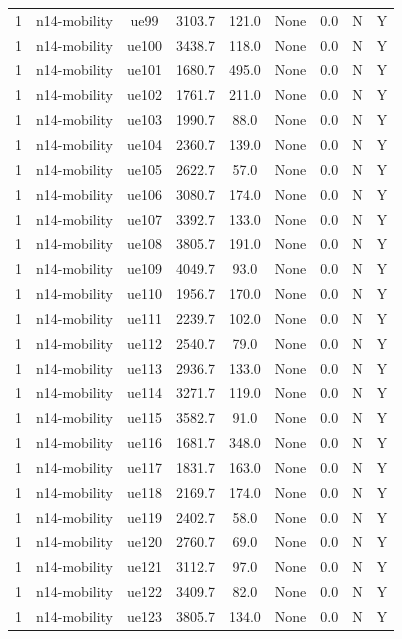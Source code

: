 \begin{table}[ht]
\begin{tabular}{|c|c|c|c|c|c|c|c|c|}
1 & n14-mobility & ue99 & 3103.7 & 121.0 & None & 0.0 & N & Y \\
1 & n14-mobility & ue100 & 3438.7 & 118.0 & None & 0.0 & N & Y \\
1 & n14-mobility & ue101 & 1680.7 & 495.0 & None & 0.0 & N & Y \\
1 & n14-mobility & ue102 & 1761.7 & 211.0 & None & 0.0 & N & Y \\
1 & n14-mobility & ue103 & 1990.7 & 88.0 & None & 0.0 & N & Y \\
1 & n14-mobility & ue104 & 2360.7 & 139.0 & None & 0.0 & N & Y \\
1 & n14-mobility & ue105 & 2622.7 & 57.0 & None & 0.0 & N & Y \\
1 & n14-mobility & ue106 & 3080.7 & 174.0 & None & 0.0 & N & Y \\
1 & n14-mobility & ue107 & 3392.7 & 133.0 & None & 0.0 & N & Y \\
1 & n14-mobility & ue108 & 3805.7 & 191.0 & None & 0.0 & N & Y \\
1 & n14-mobility & ue109 & 4049.7 & 93.0 & None & 0.0 & N & Y \\
1 & n14-mobility & ue110 & 1956.7 & 170.0 & None & 0.0 & N & Y \\
1 & n14-mobility & ue111 & 2239.7 & 102.0 & None & 0.0 & N & Y \\
1 & n14-mobility & ue112 & 2540.7 & 79.0 & None & 0.0 & N & Y \\
1 & n14-mobility & ue113 & 2936.7 & 133.0 & None & 0.0 & N & Y \\
1 & n14-mobility & ue114 & 3271.7 & 119.0 & None & 0.0 & N & Y \\
1 & n14-mobility & ue115 & 3582.7 & 91.0 & None & 0.0 & N & Y \\
1 & n14-mobility & ue116 & 1681.7 & 348.0 & None & 0.0 & N & Y \\
1 & n14-mobility & ue117 & 1831.7 & 163.0 & None & 0.0 & N & Y \\
1 & n14-mobility & ue118 & 2169.7 & 174.0 & None & 0.0 & N & Y \\
1 & n14-mobility & ue119 & 2402.7 & 58.0 & None & 0.0 & N & Y \\
1 & n14-mobility & ue120 & 2760.7 & 69.0 & None & 0.0 & N & Y \\
1 & n14-mobility & ue121 & 3112.7 & 97.0 & None & 0.0 & N & Y \\
1 & n14-mobility & ue122 & 3409.7 & 82.0 & None & 0.0 & N & Y \\
1 & n14-mobility & ue123 & 3805.7 & 134.0 & None & 0.0 & N & Y \\

\end{tabular}
\end{table}
